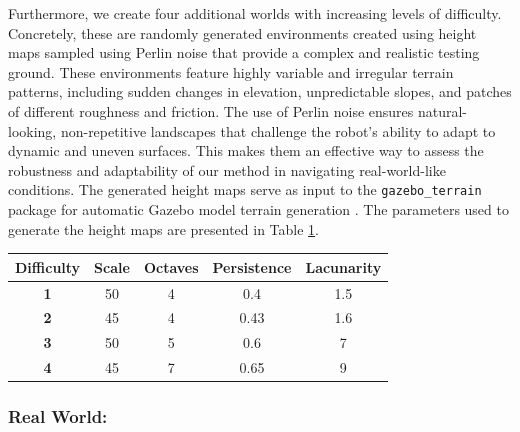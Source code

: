 \documentclass[Afour,sageh,times]{sagej}
\theoremstyle{lemma}
\begin{document}
Furthermore, we create four additional worlds with increasing levels of difficulty. Concretely, these are randomly generated environments created using height maps sampled using Perlin noise \cite[]{perlin1985image} that provide a complex and realistic testing ground. These environments feature highly variable and irregular terrain patterns, including sudden changes in elevation, unpredictable slopes, and patches of different roughness and friction. The use of Perlin noise ensures natural-looking, non-repetitive landscapes that challenge the robot’s ability to adapt to dynamic and uneven surfaces. This makes them an effective way to assess the robustness and adaptability of our method in navigating real-world-like conditions. The generated height maps serve as input to the \texttt{gazebo\_terrain} package for automatic Gazebo model terrain generation \cite[]{gazebo_terrain}. The parameters used to generate the height maps are presented in Table \ref{tab:simulation-environments-params}. 

\begin{table} %
    \centering
    \small
    \begin{tabular}{ccccc}
    \toprule
    \textbf{Difficulty} & \textbf{Scale} & \textbf{Octaves} & \textbf{Persistence} & \textbf{Lacunarity} \\
    \midrule

        \textbf{1} & 50 & 4 & 0.4 & 1.5 \\
        \textbf{2} & 45 & 4 & 0.43 & 1.6 \\
        \textbf{3} & 50 & 5 & 0.6 & 7 \\
        \textbf{4} & 45 & 7 & 0.65 & 9 \\

    \bottomrule
    \end{tabular}
    \label{tab:simulation-environments-params}
\end{table}

\subsubsection{Real World:}
\end{document}
